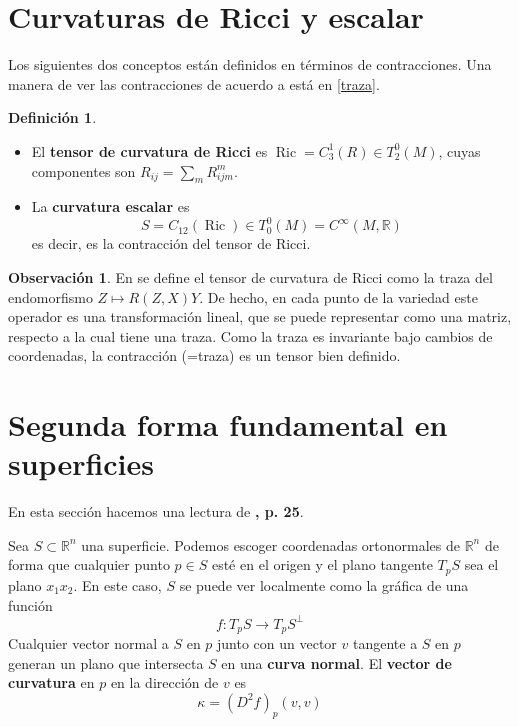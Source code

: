 \documentclass[spanish]{book}
\theoremstyle{definition}
\newtheorem*{defn}{Definición}
\newtheorem*{obs}{Observación}
\newcommand{\R}{\mathbb{R}}
\newcommand{\Cinf}{C^\infty}
\begin{document}
	\section{Curvaturas de Ricci y escalar}
	Los siguientes dos conceptos están definidos en términos de contracciones. Una manera de ver las contracciones de acuerdo a \cite{Lee-riem} está en \cref{traza}.
	\begin{defn}\leavevmode
		\begin{itemize}
			\item El \textbf{tensor de curvatura de Ricci} es $\operatorname{Ric}=C_3^1(R)\in T^0_2(M)$, cuyas componentes son $R_{ij}=\sum_m R_{ijm}^m$.
			\item La \textbf{curvatura escalar} es
			\[S=C_{12}(\operatorname{Ric})\in T^0_0(M)=\Cinf(M,\R)\]
			es decir, es la contracción del tensor de Ricci.
		\end{itemize}
	\end{defn}
	\begin{obs}
		En \cite{Lee-riem} se define el tensor de curvatura de Ricci como la traza del endomorfismo $Z\mapsto R(Z,X)Y$. De hecho, en cada punto de la variedad este operador es una transformación lineal, que se puede representar como una matriz, respecto a la cual tiene una traza. Como la traza es invariante bajo cambios de coordenadas, la contracción (=traza) es un tensor bien definido.
	\end{obs}
	\section{Segunda forma fundamental en superficies}
		En esta sección hacemos una lectura de \cite{Morgan}\textbf{, p. 25}.
		
		Sea $S\subset\R^n$ una superficie. Podemos escoger coordenadas ortonormales de $\R^n$ de forma que cualquier punto $p\in S$ esté en el origen y el plano tangente $T_pS$ sea el plano $x_1x_2$. En este caso, $S$ se puede ver localmente como la gráfica de una función
		\[f:T_pS\to T_pS^\perp\]
		Cualquier vector normal a $S$ en $p$ junto con un vector $v$ tangente a $S$ en $p$ generan un plano que intersecta $S$ en una \textbf{curva normal}. El \textbf{vector de curvatura} en $p$ en la dirección de $v$ es
		\[\kappa=(D^2f)_p(v,v)\]
		
\end{document}
